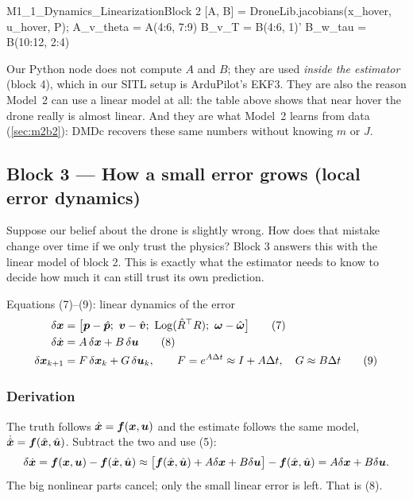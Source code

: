 \begin{toycode}{M1\_1\_Dynamics\_Linearization}{Block 2}
[A, B] = DroneLib.jacobians(x_hover, u_hover, P);
A_v_theta = A(4:6, 7:9)      %
B_v_T     = B(4:6, 1)'       %
B_w_tau   = B(10:12, 2:4)    %
\end{toycode}

\begin{real}
Our Python node does not compute $A$ and $B$; they are used \emph{inside the estimator} (block 4), which in our
SITL setup is ArduPilot's EKF3. They are also the reason Model~2 can use a linear model at all: the table above shows
that near hover the drone really is almost linear. And they are what Model~2 learns from data
(\cref{sec:m2b2}): DMDc recovers these same numbers without knowing $m$ or $J$.
\end{real}

\subsection{Block 3 --- How a small error grows (local error dynamics)}
\label{sec:m1b3}

\begin{idea}
Suppose our belief about the drone is slightly wrong. How does that mistake change over time if we only trust the
physics? Block 3 answers this with the linear model of block 2. This is exactly what the estimator needs to know to
decide how much it can still trust its own prediction.
\end{idea}

\begin{eqbox}{Equations (7)--(9): linear dynamics of the error}
\begin{align}
  \delta\vx &= \big[\vp-\hp;\ \vv-\hv;\ \Log(\hR^\top R);\ \vw-\hw\big] \tag{7}\label{eq:7}\\
  \delta\dot{\vx} &= A\,\delta\vx + B\,\delta\vu \tag{8}\label{eq:8}\\
  \delta\vx_{k+1} &= F\,\delta\vx_k + G\,\delta\vu_k,\qquad F=e^{A\Delta t}\approx I+A\Delta t,\quad G\approx B\Delta t \tag{9}\label{eq:9}
\end{align}
\end{eqbox}

\subsubsection*{Derivation}
The truth follows $\dot{\bm{x}}=\bm{f}(\bm{x},\bm{u})$ and the estimate follows the same model, $\dot{\hat{\bm x}}=\bm{f}(\hat{\bm x},\hat{\bm{u}})$.
Subtract the two and use (5):
\[
\delta\dot{\bm{x}}=\bm{f}(\bm{x},\bm{u})-\bm{f}(\hat{\bm x},\hat{\bm{u}})\approx\big[\bm{f}(\hat{\bm x},\hat{\bm{u}})+A\delta\bm{x}+B\delta\bm{u}\big]-\bm{f}(\hat{\bm x},\hat{\bm{u}})=A\delta\bm{x}+B\delta\bm{u} .
\]
The big nonlinear parts cancel; only the small linear error is left. That is (8).

